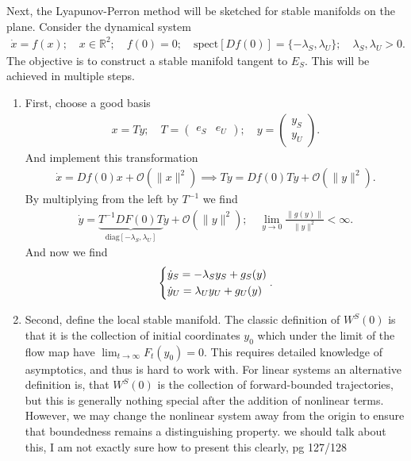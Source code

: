 Next, the Lyapunov-Perron method will be sketched for stable manifolds on the plane. Consider the dynamical system
\begin{align}
	\dot{x} = f(x);\quad x \in \mathbb{R}^{2};\quad f(0)=0;\quad  \textrm{spect} [Df(0)] = \{ - \lambda _{S}, \lambda _{U}\};\quad \lambda _S, \lambda_U > 0. \label{eq9:LP_method1}
\end{align}
The objective is to construct a stable manifold tangent to $E_{S}$. This will be achieved in multiple steps.
\begin{enumerate}
	\item First, choose a good basis
		\begin{align}
			x = Ty;\quad T = 
			\begin{pmatrix}
				e_{S} & e_{U}
			\end{pmatrix}
		;\quad y =
		\begin{pmatrix}
			y_S \\
			y_U
		\end{pmatrix}
		.
		\end{align}
	And implement this transformation 
	\begin{align}
		\dot{x} = Df(0)x + \mathcal{O}(\|x\|^{2}) \implies T\dot{y} = Df(0)Ty + \mathcal{O}(\| y\|^{2}).
	\end{align}
	By multiplying from the left by $T^{-1}$ we find
	\begin{align}
		\dot{y} = \underbrace{T^{-1}DF(0)T}_{ \textrm{diag} [-\lambda_S, \lambda_U ]}y + \mathcal{O}(\|y\|^{2});\quad \lim_{y \to 0} \frac{\|g(y)\|}{\|y\|^{2}}< \infty .
	\end{align}
	And now we find
	\begin{align}
		\begin{dcases}
			\dot{y}_{S} = - \lambda _{S}y_{S} + g_{S}(y) \\
			\dot{y}_{U} = \lambda _{U}y_{U} + g_{U}(y)
		\end{dcases}
		.
	\end{align}

\item Second, define the local stable manifold. The classic definition of $W^{S}(0)$ is that it is the collection of initial coordinates $y_0$ which under the limit of the flow map have $\lim_{t \to \infty }F_{t}(y_0)=0$. This requires detailed knowledge of asymptotics, and thus is hard to work with. For linear systems an alternative definition is, that $W^S(0)$ is the collection of forward-bounded trajectories, but this is generally nothing special after the addition of nonlinear terms. However, we may change the nonlinear system away from the origin to ensure that boundedness remains a distinguishing property. 
	{\color{blue} we should talk about this, I am not exactly sure how to present this clearly, pg 127/128}


\end{enumerate}
